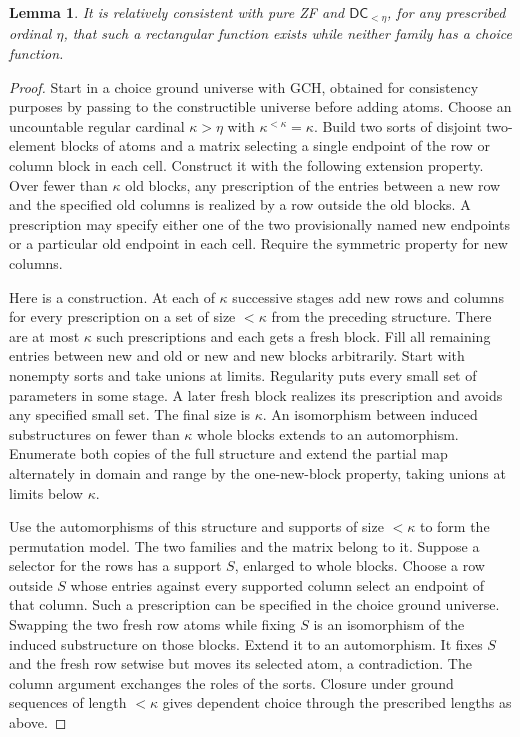 \documentclass[11pt]{article}
\newtheorem{lemma}[theorem]{Lemma}
\newcommand{\DC}{\mathsf{DC}}
\begin{document}
\begin{lemma}\label{matrix}
It is relatively consistent with pure ZF and $\DC_{<\eta}$, for any prescribed ordinal $\eta$, that such a rectangular function exists while neither family has a choice function.
\end{lemma}
\begin{proof}
Start in a choice ground universe with GCH, obtained for consistency purposes by passing to the constructible universe before adding atoms. Choose an uncountable regular cardinal $\kappa>\eta$ with $\kappa^{<\kappa}=\kappa$. Build two sorts of disjoint two-element blocks of atoms and a matrix selecting a single endpoint of the row or column block in each cell. Construct it with the following extension property. Over fewer than $\kappa$ old blocks, any prescription of the entries between a new row and the specified old columns is realized by a row outside the old blocks. A prescription may specify either one of the two provisionally named new endpoints or a particular old endpoint in each cell. Require the symmetric property for new columns.

Here is a construction. At each of $\kappa$ successive stages add new rows and columns for every prescription on a set of size $<\kappa$ from the preceding structure. There are at most $\kappa$ such prescriptions and each gets a fresh block. Fill all remaining entries between new and old or new and new blocks arbitrarily. Start with nonempty sorts and take unions at limits. Regularity puts every small set of parameters in some stage. A later fresh block realizes its prescription and avoids any specified small set. The final size is $\kappa$. An isomorphism between induced substructures on fewer than $\kappa$ whole blocks extends to an automorphism. Enumerate both copies of the full structure and extend the partial map alternately in domain and range by the one-new-block property, taking unions at limits below $\kappa$.

Use the automorphisms of this structure and supports of size $<\kappa$ to form the permutation model. The two families and the matrix belong to it. Suppose a selector for the rows has a support $S$, enlarged to whole blocks. Choose a row outside $S$ whose entries against every supported column select an endpoint of that column. Such a prescription can be specified in the choice ground universe. Swapping the two fresh row atoms while fixing $S$ is an isomorphism of the induced substructure on those blocks. Extend it to an automorphism. It fixes $S$ and the fresh row setwise but moves its selected atom, a contradiction. The column argument exchanges the roles of the sorts. Closure under ground sequences of length $<\kappa$ gives dependent choice through the prescribed lengths as above.


\end{proof}
\end{document}
